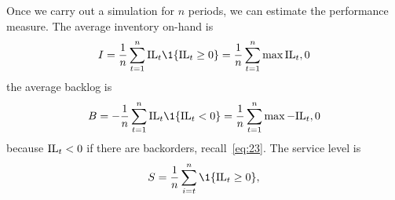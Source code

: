 Once we carry out a simulation for $n$ periods, we can estimate the
performance measure. The average  inventory on-hand is
\begin{equation}
  \label{eq:22}
  I = \frac 1n \sum_{t=1}^n \IL_t\1{\IL_t \geq 0} = \frac1n\sum_{t=1}^n \max{\IL_t, 0}
\end{equation}
the average backlog  is
\begin{equation}
  B = - \frac 1n \sum_{t=1}^n \IL_t\1{\IL_t < 0} = \frac1n\sum_{t=1}^n \max{-\IL_t, 0}
\end{equation}
because $\textrm{IL}_t<0$ if there are backorders, recall~\eqref{eq:23}. 
The service level is 
\begin{equation}
  \label{eq:22}
  S = \frac 1n \sum_{i=t}^n \1{\IL_t \geq 0},
\end{equation}




